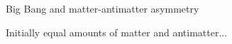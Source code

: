 \documentclass[dvipsnames]{beamer}
\begin{document}
\begin{frame}{Big Bang and matter-antimatter asymmetry}
  \begin{figure}
  \end{figure}
  \begin{center}
    \Large Initially equal amounts of matter and antimatter...
  \end{center}
\end{frame}
\end{document}
